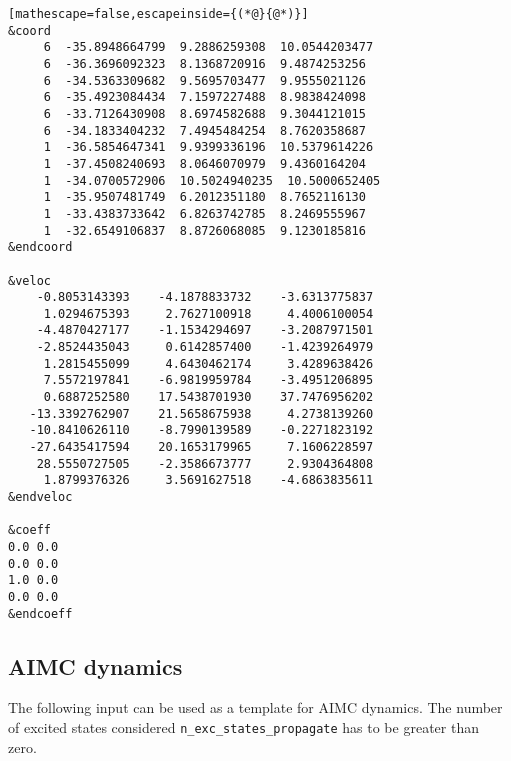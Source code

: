 \begin{lstlisting}[mathescape=false,escapeinside={(*@}{@*)}]
&coord
     6  -35.8948664799  9.2886259308  10.0544203477
     6  -36.3696092323  8.1368720916  9.4874253256
     6  -34.5363309682  9.5695703477  9.9555021126
     6  -35.4923084434  7.1597227488  8.9838424098
     6  -33.7126430908  8.6974582688  9.3044121015
     6  -34.1833404232  7.4945484254  8.7620358687
     1  -36.5854647341  9.9399336196  10.5379614226
     1  -37.4508240693  8.0646070979  9.4360164204
     1  -34.0700572906  10.5024940235  10.5000652405
     1  -35.9507481749  6.2012351180  8.7652116130
     1  -33.4383733642  6.8263742785  8.2469555967
     1  -32.6549106837  8.8726068085  9.1230185816
&endcoord

&veloc
    -0.8053143393    -4.1878833732    -3.6313775837
     1.0294675393     2.7627100918     4.4006100054
    -4.4870427177    -1.1534294697    -3.2087971501
    -2.8524435043     0.6142857400    -1.4239264979
     1.2815455099     4.6430462174     3.4289638426
     7.5572197841    -6.9819959784    -3.4951206895
     0.6887252580    17.5438701930    37.7476956202
   -13.3392762907    21.5658675938     4.2738139260
   -10.8410626110    -8.7990139589    -0.2271823192
   -27.6435417594    20.1653179965     7.1606228597
    28.5550727505    -2.3586673777     2.9304364808
     1.8799376326     3.5691627518    -4.6863835611
&endveloc

&coeff
0.0 0.0
0.0 0.0
1.0 0.0
0.0 0.0
&endcoeff
\end{lstlisting}

\subsection{AIMC dynamics}

The following input can be used as a template for AIMC dynamics. The number of excited states considered \verb+n_exc_states_propagate+ has to be greater than zero.

